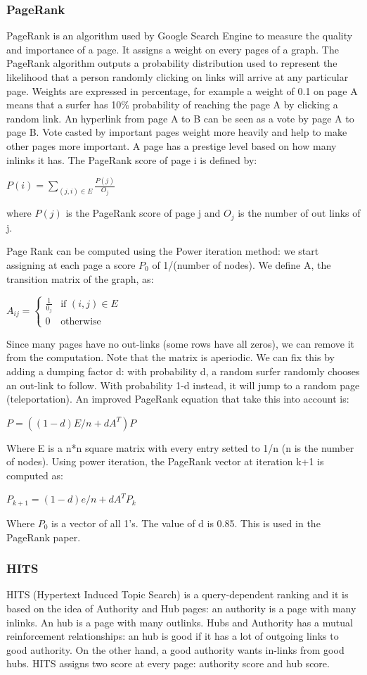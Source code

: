 \documentclass[10pt]{article}
\begin{document}
\subsubsection{PageRank}
PageRank is an algorithm used by Google Search Engine to measure the quality and importance of a page. It assigns a weight on every pages of a graph.
The PageRank algorithm outputs a probability distribution used to represent the likelihood that a person randomly clicking on links will arrive at any particular page.
Weights are expressed in percentage, for example a weight of 0.1 on page A means that a surfer has 10\% probability of reaching the page A by clicking a random link.
An hyperlink from page A to B can be seen as a vote by page A to page B. Vote casted by important pages weight more heavily and help to make other pages more important.
A page has a prestige level based on how many inlinks it has.
The PageRank score of page i is defined by:

$P(i)=\sum_{(j,i) \in E}\frac{P(j)}{O_j}$

where $P(j)$ is the PageRank score of page j and $O_j$ is the number of out links of j.

Page Rank can be computed using the Power iteration method: we start assigning at each page a score $P_{0}$ of 1/(number of nodes). We define A, the transition matrix of the graph, as:

$A_{ij} = \begin{cases} \frac{1}{0_j} & \mbox{if } (i,j) \in E \\ 0 & \mbox{otherwise}\end{cases}$

Since many pages have no out-links (some rows have all zeros), we can remove it from the computation.  
Note that the matrix is aperiodic. We can fix this by adding a dumping factor d: with probability d, a random surfer randomly chooses an out-link to follow. With probability 1-d instead, it will jump to a random page (teleportation).
An improved PageRank equation that take this into account is:

$P=((1-d)E/n+dA^T)P$

Where E is a n*n square matrix with every entry setted to 1/n (n is the number of nodes).
Using power iteration, the PageRank vector at iteration k+1 is computed as:

$P_{k+1} = (1-d)e/n+dA^TP_k$

Where $P_0$ is a vector of all 1's.
The value of d is 0.85. This is used in the PageRank paper.
\subsubsection{HITS}
HITS (Hypertext Induced Topic Search) is a query-dependent ranking and it is based on the idea of Authority and Hub pages: an authority is a page with many inlinks. An hub is a page with many outlinks.
Hubs and Authority has a mutual reinforcement relationships: an hub is good if it has a lot of outgoing links to good authority. On the other hand, a good authority wants in-links from good hubs.
HITS assigns two score at every page: authority score and hub score.
\end{document}
